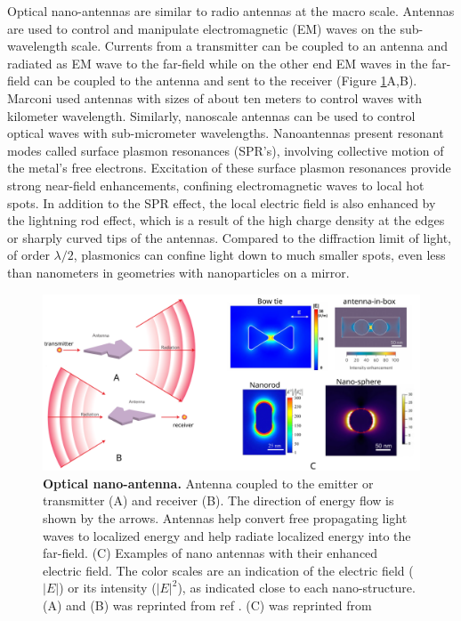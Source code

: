 Optical nano-antennas are similar to radio antennas at the macro scale.
Antennas are used to control and manipulate electromagnetic (EM) waves on the sub-wavelength scale.
Currents from a transmitter can be coupled to an antenna and radiated as EM wave to the far-field while on the other end EM waves in the far-field can be coupled to the antenna and sent to the receiver (Figure \ref{fig:nano_antenna}A,B).
Marconi used antennas with sizes of about ten meters to control waves with kilometer wavelength. 
Similarly, nanoscale antennas can be used to control optical waves with sub-micrometer wavelengths. Nanoantennas present resonant modes called surface plasmon resonances (SPR's), involving collective motion of the metal's free electrons. Excitation of these surface plasmon resonances provide strong near-field enhancements, confining electromagnetic waves to local hot spots. \cite{bath8624,schuller2010plasmonics,ozbay2006plasmonics,maier2005plasmonics,hess2012active} In addition to the SPR effect, the local electric field is also enhanced by the lightning rod effect, which is a result of the high charge density at the edges or sharply curved tips of the antennas.
Compared to the diffraction limit of light, of order $\lambda/2$, plasmonics can confine light down to much smaller spots, even less than nanometers in geometries with nanoparticles on a mirror\cite{benz2016singlemolecule}.
\begin{figure}
	\centering
	\includegraphics[width=\textwidth]{nano_antenna}
	\caption{\textbf{Optical nano-antenna.} Antenna coupled to the emitter or transmitter (A) and receiver (B). The direction of energy flow is shown by the arrows.
	Antennas help convert free propagating light waves to localized energy and help radiate localized energy into the far-field.
	(C) Examples of nano antennas with their enhanced electric field.
	The color scales are an indication of the electric field ($|E|$) or its intensity ($|E|^2$), as indicated close to each nano-structure. (A) and (B) was reprinted from ref \cite{novotny2011antennas}. (C) was reprinted from \cite{kinkhabwala2009large,punj2013a,khatua2014resonant}}
	\label{fig:nano_antenna}
\end{figure}

